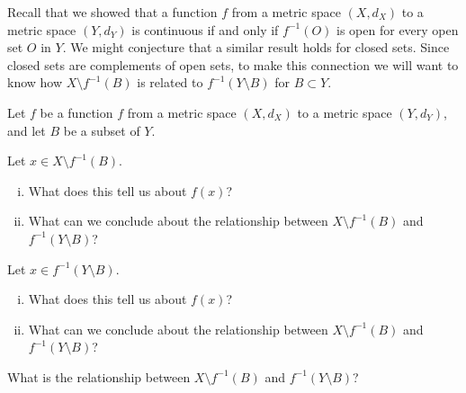  \label{sec_cont_closed_sets}
Recall that we showed that a function $f$ from a metric space $(X,d_X)$ to a metric space $(Y,d_Y)$ is continuous if and only if $f^{-1}(O)$ is open for every open set $O$ in $Y$. We might conjecture that a similar result holds for closed sets. Since closed sets are complements of open sets, to make this connection we will want to know how $X \setminus f^{-1}(B)$ is related to $f^{-1}(Y \setminus B)$ for $B \subset Y$. 

\begin{activity} \label{act:CS_1} Let $f$ be a function $f$ from a metric space $(X,d_X)$ to a metric space $(Y,d_Y)$, and let $B$ be a subset of $Y$.
\ba
\item Let $x \in X \setminus f^{-1}(B)$.
	\begin{enumerate}[i.]
	\item What does this tell us about $f(x)$?

	\item What can we conclude about the relationship between $X \setminus f^{-1}(B)$ and $f^{-1}(Y \setminus B)$?
		
	\end{enumerate}
	
\item Let $x \in f^{-1}(Y \setminus B)$.
	\begin{enumerate}[i.]
	\item What does this tell us about $f(x)$?

	\item What can we conclude about the relationship between $X \setminus f^{-1}(B)$ and $f^{-1}(Y \setminus B)$?
		
	\end{enumerate}	

	\item What is the relationship between $X \setminus f^{-1}(B)$ and $f^{-1}(Y \setminus B)$?
	
\ea

\end{activity}

